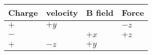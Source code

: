 		
		\begin{tabular}{||l|l|l|l||} \hline
		 Charge &  velocity & B field & Force\\ \hline\hline
		 $ + $ & $ +y $ &         &  $ -z $\\ \hline
		 $ - $ &        & $ +x $  &  $ +z $\\  \hline 
		 $ + $ & $ -z $ &  $ +y $ &        \\  \hline 
		\end{tabular}
		
